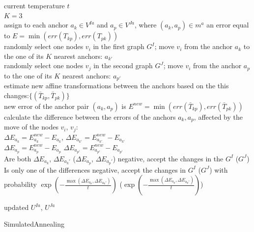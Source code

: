 \documentclass[
	fontsize=12pt,
	paper=a4,
	twoside=false,
	numbers=noenddot,
	plainheadsepline,
	toc=listof,
	toc=bibliography
]{scrartcl}
\begin{document}
\vspace{10pt}
\setcounter{algocf}{1}
\begin{algorithm}[H]
		\hspace{45pt}current temperature $t$\\
	\nl $K=3$\\
	\nl assign to each anchor $a_k\in V^{Ia}$ and $a_p\in V^{Ja}$, where $(a_k, a_p)\in m^a$ an error equal to $E = \min(err(T_{kp}), err(T_{pk}))$\\
	\nl randomly select one nodes $v_i$ in the first graph $G^I$; move $v_i$ from the anchor $a_k$ to the one of its $K$ nearest anchors: $a_{k'}$\\
	\nl randomly select one nodes $v_j$ in the second graph $G^J$; move $v_i$ from the anchor $a_p$ to the one of its $K$ nearest anchors: $a_{p'}$\\
	\nl estimate new affine transformations between the anchors based on the this changes:$\{(\bar{T}_{kp}, \bar{T}_{pk})\}$ \\
	\nl new error of the anchor pair  $(a_k, a_p)$ is $E^{new}=\min(err(\bar{T}_{kp}), err(\bar{T}_{pk}))$\\
	\nl calculate the difference between the errors of the anchors $a_k, a_p$, affected by the move of the nodes $v_i$, $v_j$:\\
	    $\Delta E_{a_k} = E^{new}_{a_k} - E_{a_k}$, $\Delta E_{a_{k'}} = E^{new}_{a_{k'}} - E_{a_{k'}}$\\
  	    $\Delta E_{a_p} = E^{new}_{a_p} - E_{a_p}$  $\Delta E_{a_{p'}} = E^{new}_{a_{p'}} - E_{a_{p'}}$\\  	    
  	\nl Are both $\Delta E_{a_k}$,  $\Delta E_{a_k'}$ ($\Delta E_{a_p}$, $\Delta E_{a_p'}$) negative, accept the changes in the $G^I$ ($G^J$) \\
  	\nl Is only one of the differences negative, accept the changes in $G^I$ ($G^J$) with probability
  	 $\exp(-\frac{\max(\Delta E_{a_k}, \Delta E_{a_k'})}{t})$ ($\exp(-\frac{\max(\Delta E_{a_p}, \Delta E_{a_p'})}{t})$)

	\Return updated $U^{Ia}$, $U^{Ja}$
	
	\caption{SimulatedAnnealing}    \label{alg:sim_annealing_ver42}
\end{algorithm}
\end{document}
